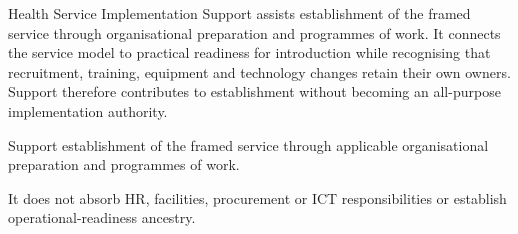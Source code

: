Health Service Implementation Support assists establishment of the framed service through organisational preparation and programmes of work. It connects the service model to practical readiness for introduction while recognising that recruitment, training, equipment and technology changes retain their own owners. Support therefore contributes to establishment without becoming an all-purpose implementation authority.



Support establishment of the framed service through applicable organisational preparation and programmes of work.



It does not absorb HR, facilities, procurement or ICT responsibilities or establish operational-readiness ancestry.


